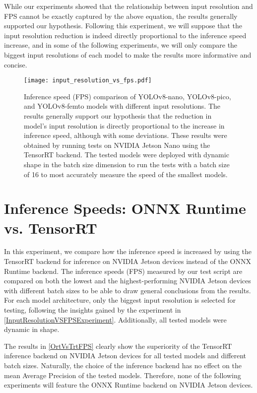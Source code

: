While our experiments showed that the relationship between input resolution and FPS
cannot be exactly captured by the above equation, the results generally
supported our hypothesis. Following this experiment, we will suppose that the
input resolution reduction is indeed directly proportional to the inference speed
increase, and in some of the following experiments, we will only compare the
biggest input resolutions of each model to make the results more informative and
concise.

\begin{figure}[t]
    \begin{framed}
        \centering
        \texttt{[image: input\_resolution\_vs\_fps.pdf]}
        \caption{Inference speed (FPS) comparison of YOLOv8-nano, YOLOv8-pico, and
        YOLOv8-femto models with different input resolutions. The results generally
        support our hypothesis that the reduction in model's input resolution is directly
        proportional to the increase in inference speed, although with some
        deviations. These results were obtained by running tests on NVIDIA Jetson
        Nano using the TensorRT backend. The tested models were deployed with
        dynamic shape in the batch size dimension to run the tests with a batch size
        of 16 to most accurately measure the speed of the smallest models.}
        \label{InputResolutionVSFPS}
    \end{framed}
\end{figure}



\section{Inference Speeds: ONNX Runtime vs. TensorRT}

In this experiment, we compare how the inference speed is increased by using the
TensorRT backend for inference on NVIDIA Jetson devices instead of the ONNX
Runtime backend. The inference speeds (FPS) measured by our test script are
compared on both the lowest and the highest-performing NVIDIA Jetson devices
with different batch sizes to be able to draw general conclusions from the
results. For each model architecture, only the biggest input resolution is
selected for testing, following the insights gained by the experiment in
\autoref{InputResolutionVSFPSExperiment}. Additionally, all tested models were
dynamic in shape.

The results in \autoref{OrtVsTrtFPS} clearly show the superiority of the
TensorRT inference backend on NVIDIA Jetson devices for all tested models and
different batch sizes. Naturally, the choice of the inference backend has no
effect on the mean Average Precision of the tested models. Therefore, none of
the following experiments will feature the ONNX Runtime backend on NVIDIA Jetson
devices.

